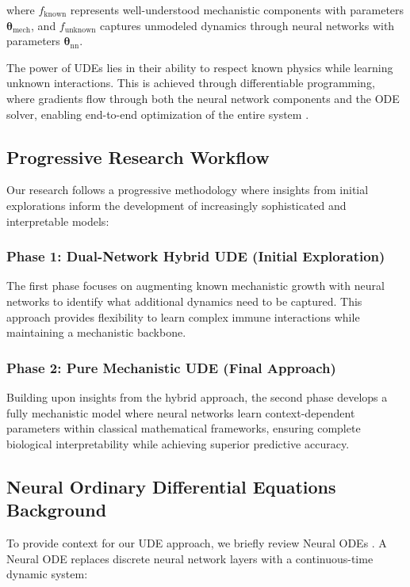 \documentclass{juliacon}
\begin{document}
where $f_{\text{known}}$ represents well-understood mechanistic components with parameters $\boldsymbol{\theta}_{\text{mech}}$, and $f_{\text{unknown}}$ captures unmodeled dynamics through neural networks with parameters $\boldsymbol{\theta}_{\text{nn}}$.

The power of UDEs lies in their ability to respect known physics while learning unknown interactions. This is achieved through differentiable programming, where gradients flow through both the neural network components and the ODE solver, enabling end-to-end optimization of the entire system \cite{massaroli2020dissecting,finlay2020train}.

\subsection{Progressive Research Workflow}

Our research follows a progressive methodology where insights from initial explorations inform the development of increasingly sophisticated and interpretable models:

\subsubsection{Phase 1: Dual-Network Hybrid UDE (Initial Exploration)}
The first phase focuses on augmenting known mechanistic growth with neural networks to identify what additional dynamics need to be captured. This approach provides flexibility to learn complex immune interactions while maintaining a mechanistic backbone.

\subsubsection{Phase 2: Pure Mechanistic UDE (Final Approach)}
Building upon insights from the hybrid approach, the second phase develops a fully mechanistic model where neural networks learn context-dependent parameters within classical mathematical frameworks, ensuring complete biological interpretability while achieving superior predictive accuracy.

\subsection{Neural Ordinary Differential Equations Background}

To provide context for our UDE approach, we briefly review Neural ODEs \cite{chen2018node}. A Neural ODE replaces discrete neural network layers with a continuous-time dynamic system:
\end{document}
